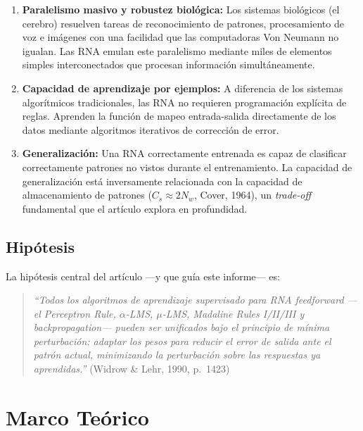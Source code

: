 \documentclass[12pt,a4paper]{article}
\begin{document}
\begin{enumerate}[label=\textbf{(\roman*)},leftmargin=*]
    \item \textbf{Paralelismo masivo y robustez biológica:} Los sistemas biológicos (el cerebro) resuelven tareas de reconocimiento de patrones, procesamiento de voz e imágenes con una facilidad que las computadoras Von Neumann no igualan. Las RNA emulan este paralelismo mediante miles de elementos simples interconectados que procesan información simultáneamente.
    \item \textbf{Capacidad de aprendizaje por ejemplos:} A diferencia de los sistemas algorítmicos tradicionales, las RNA no requieren programación explícita de reglas. Aprenden la función de mapeo entrada-salida directamente de los datos mediante algoritmos iterativos de corrección de error.
    \item \textbf{Generalización:} Una RNA correctamente entrenada es capaz de clasificar correctamente patrones no vistos durante el entrenamiento. La capacidad de generalización está inversamente relacionada con la capacidad de almacenamiento de patrones ($C_s \approx 2N_w$, Cover, 1964), un \textit{trade-off} fundamental que el artículo explora en profundidad.
\end{enumerate}

\subsection{Hipótesis}

La hipótesis central del artículo —y que guía este informe— es:

\begin{quote}
\textit{``Todos los algoritmos de aprendizaje supervisado para RNA feedforward —el Perceptron Rule, $\alpha$-LMS, $\mu$-LMS, Madaline Rules I/II/III y backpropagation— pueden ser unificados bajo el principio de mínima perturbación: adaptar los pesos para reducir el error de salida ante el patrón actual, minimizando la perturbación sobre las respuestas ya aprendidas.''} \hfill (Widrow \& Lehr, 1990, p.~1423)
\end{quote}

\section{Marco Teórico}
\end{document}
